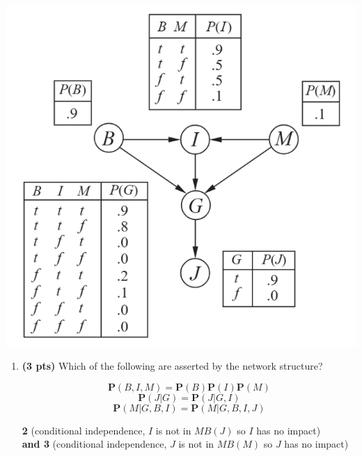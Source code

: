 \documentclass{article}
\begin{document}
\begin{enumerate}
\begin{center}
    \includegraphics[scale=0.75]{472-PS10-Q3.png}
\end{center}

    \begin{enumerate}[label=($\alph*$)]


    \item \textbf{(3 pts)} Which of the following are asserted by the network structure?

    \begin{equation}
        \mathbf{P}(B,I,M)=\mathbf{P}(B)\mathbf{P}(I)\mathbf{P}(M)
    \end{equation}
    \begin{equation}
        \mathbf{P}(J|G)=\mathbf{P}(J|G,I)
    \end{equation}
    \begin{equation}
        \mathbf{P}(M|G,B,I)=\mathbf{P}(M|G,B,I,J)
    \end{equation}

    \color{blue}
        \textbf{2} (conditional independence, $I$ is not in $MB(J)$ so $I$ has no impact)\\
        \textbf{and 3} (conditional independence, $J$ is not in $MB(M)$ so $J$ has no impact)
    \color{black}


\end{enumerate}
\end{enumerate}
\end{document}
